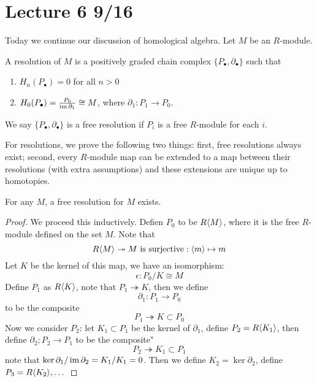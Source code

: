 
\section{Lecture 6 9/16}
Today we continue our discussion of homological algebra. Let $M$ be an $R$-module. 
\begin{defn}[resolution]
    A resolution of $M$ is a positively graded chain complex $\{P_\bullet, \partial_\bullet\}$ such that 
    \begin{enumerate}
        \item $H_n(P_\bullet)=0$ for all $n>0$
        \item $H_0(P_\bullet)=\frac{P_0}{\operatorname{im}\partial_1}\cong M$, where $\partial_1:P_1\to P_0$.
    \end{enumerate}
    We say $\{P_\bullet,\partial_\bullet\}$ is a free resolution if $P_i$ is a free $R$-module for each $i$.
\end{defn}
For resolutions, we prove the following two things: first, free resolutions always exist; second, every $R$-module map can be extended to a map between their resolutions (with extra assumptions) and these extensions are unique up to homotopies.
\begin{prop}
    For any $M$, a free resolution for $M$ exists.
\end{prop}
\begin{proof}
    We proceed this inductively. Defien $P_0$ to be $R\langle M\rangle$, where it is the free $R$-module defined on the set $M$. Note that 
    \begin{equation*}
        R\langle M\rangle\twoheadrightarrow M \text{ is surjective}: \langle m\rangle\mapsto m
    \end{equation*}
    Let $K$ be the kernel of this map, we have an isomorphism:
    \begin{equation*}
        \epsilon: P_0/K\cong M
    \end{equation*}
    Define $P_1$ as $R\langle K\rangle$, note that $P_1\twoheadrightarrow K$, then we define 
    \begin{equation*}
        \partial_1: P_1\to P_0
    \end{equation*}
    to be the composite 
    \begin{equation*}
        P_1\twoheadrightarrow K\subset P_0
    \end{equation*}
    Now we consider $P_2$: let $K_1\subset P_1$ be the kernel of $\partial_1$, define $P_2=R\langle K_1\rangle$, then define $\partial_2; P_2\to P_1$ to be the composite"
    \begin{equation*}
        P_2\twoheadrightarrow K_1\subset P_1
    \end{equation*}
    note that $\ker\partial_1/\operatorname{im}\partial_2=K_1/K_1=0$. Then we define $K_2=\ker\partial_2$, define $P_3=R\langle K_2\rangle, \dots$
\end{proof}
